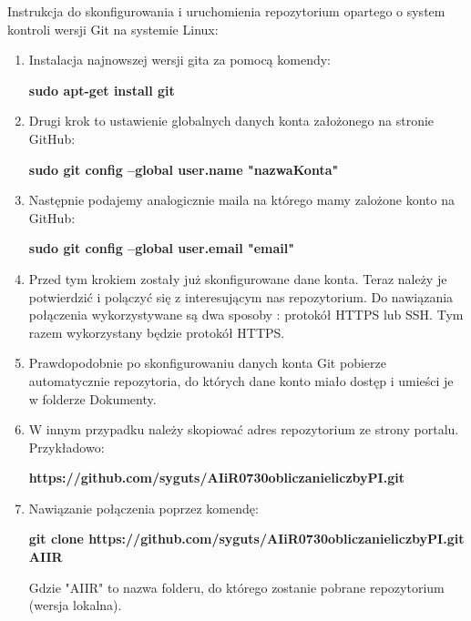 \documentclass[a4paper,12pt]{article}		%
\begin{document}
Instrukcja do skonfigurowania i uruchomienia repozytorium opartego o system kontroli wersji Git na systemie Linux:

\begin{enumerate}
\item Instalacja najnowszej wersji gita za pomocą komendy:
\begin{center}
\textbf{sudo apt-get install git}
\end{center}

\item Drugi krok to ustawienie globalnych danych konta założonego na stronie GitHub:
\begin{center}
\textbf{sudo git config --global user.name "nazwaKonta" }
\end{center}

\item Następnie podajemy analogicznie maila na którego mamy zalożone konto na GitHub:
\begin{center}
\textbf{sudo git config --global user.email "email"}
\end{center}

\item Przed tym krokiem zostały już skonfigurowane dane konta.  Teraz należy je potwierdzić i polączyć się z interesującym nas repozytorium. Do nawiązania połączenia wykorzystywane są dwa sposoby : protokół HTTPS lub SSH. Tym razem wykorzystany będzie protokół HTTPS.

\item Prawdopodobnie po skonfigurowaniu danych konta Git pobierze automatycznie repozytoria, do których dane konto miało dostęp i umieści je w folderze Dokumenty.

\item W innym przypadku należy skopiować adres repozytorium ze strony portalu. Przykładowo:
\begin{center}
\textbf{https://github.com/syguts/AIiR0730obliczanieliczbyPI.git}
\end{center}

\item Nawiązanie połączenia poprzez komendę:
\begin{center}
\textbf{git clone https://github.com/syguts/AIiR0730obliczanieliczbyPI.git AIIR}
\end{center}
Gdzie "AIIR" to nazwa folderu, do którego zostanie pobrane repozytorium (wersja lokalna).
\end{enumerate}
\end{document}
